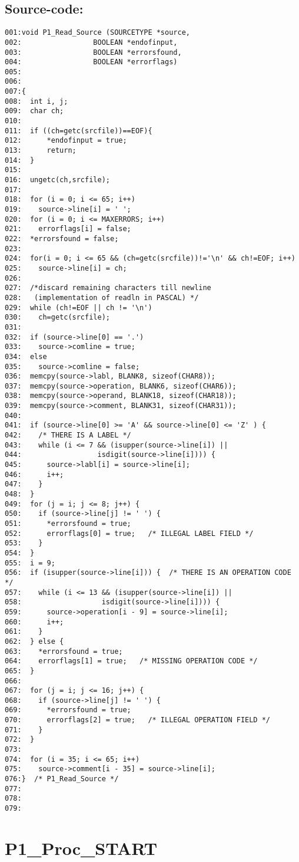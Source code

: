 \subsection*{Source-code:}
\begin{verbatim}
001:void P1_Read_Source (SOURCETYPE *source,
002:                 BOOLEAN *endofinput, 
003:                 BOOLEAN *errorsfound,
004:                 BOOLEAN *errorflags)
005:
006:
007:{
008:  int i, j;
009:  char ch;
010:
011:  if ((ch=getc(srcfile))==EOF){
012:      *endofinput = true;
013:      return;
014:  }
015:
016:  ungetc(ch,srcfile);
017:
018:  for (i = 0; i <= 65; i++)
019:    source->line[i] = ' ';
020:  for (i = 0; i <= MAXERRORS; i++)
021:    errorflags[i] = false;
022:  *errorsfound = false;
023:  
024:  for(i = 0; i <= 65 && (ch=getc(srcfile))!='\n' && ch!=EOF; i++)
025:    source->line[i] = ch;
026:
027:  /*discard remaining characters till newline
028:   (implementation of readln in PASCAL) */ 
029:  while (ch!=EOF || ch != '\n')
030:    ch=getc(srcfile);
031:  
032:  if (source->line[0] == '.')
033:    source->comline = true;
034:  else
035:    source->comline = false;
036:  memcpy(source->labl, BLANK8, sizeof(CHAR8));
037:  memcpy(source->operation, BLANK6, sizeof(CHAR6));
038:  memcpy(source->operand, BLANK18, sizeof(CHAR18));
039:  memcpy(source->comment, BLANK31, sizeof(CHAR31));
040:
041:  if (source->line[0] >= 'A' && source->line[0] <= 'Z' ) { 
042:    /* THERE IS A LABEL */
043:    while (i <= 7 && (isupper(source->line[i]) ||
044:                  isdigit(source->line[i]))) {
045:      source->labl[i] = source->line[i];
046:      i++;
047:    }
048:  }
049:  for (j = i; j <= 8; j++) {
050:    if (source->line[j] != ' ') {
051:      *errorsfound = true;
052:      errorflags[0] = true;   /* ILLEGAL LABEL FIELD */
053:    }
054:  }
055:  i = 9;
056:  if (isupper(source->line[i])) {  /* THERE IS AN OPERATION CODE */
057:    while (i <= 13 && (isupper(source->line[i]) ||
058:                   isdigit(source->line[i]))) {
059:      source->operation[i - 9] = source->line[i];
060:      i++;
061:    }
062:  } else {
063:    *errorsfound = true;
064:    errorflags[1] = true;   /* MISSING OPERATION CODE */
065:  }
066:
067:  for (j = i; j <= 16; j++) {
068:    if (source->line[j] != ' ') {
069:      *errorsfound = true;
070:      errorflags[2] = true;   /* ILLEGAL OPERATION FIELD */
071:    }
072:  }
073:
074:  for (i = 35; i <= 65; i++)
075:    source->comment[i - 35] = source->line[i];
076:}  /* P1_Read_Source */
077:
078:
079:
\end{verbatim}
\section{P1\_Proc\_START}
